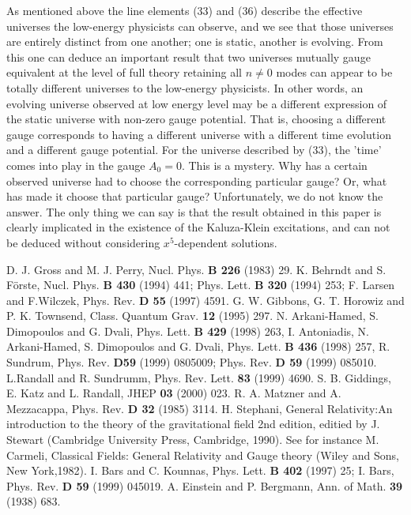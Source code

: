 \documentclass[a4paper,12pt]{article}
\begin{document}
 As mentioned above the line elements (33) and (36)
describe the effective universes the low-energy physicists can
observe, and we see that those universes are entirely distinct
from one another; one is static, another is evolving. From this
one can deduce an important result that two universes mutually
gauge equivalent at the level of full theory retaining all $n\neq
0$ modes can appear to be totally different universes to the
low-energy physicists. In other words, an evolving universe
observed at low energy level may be a different expression of the
static universe with non-zero gauge potential. That is, choosing a
different gauge corresponds to having a different universe with a
different time evolution and a different gauge potential. For the
universe described by (33), the 'time' comes into play in the
gauge $A_0=0$. This is a mystery. Why has a certain observed
universe had to choose the corresponding particular gauge? Or,
what has made it choose that particular gauge? Unfortunately, we
do not know the answer. The only thing we can say is that the
result obtained in this paper is clearly implicated in the
existence of the Kaluza-Klein excitations, and can not be deduced
without considering $x^5$-dependent solutions.
\begin{thebibliography}{123}
D. J. Gross and M. J. Perry, Nucl. Phys. {\bf B 226} 
(1983) 29.
K. Behrndt and S. F\"{o}rste, Nucl. Phys. {\bf B  430}
(1994) 441; Phys. Lett. {\bf B 320} (1994) 253; F. Larsen and
F.Wilczek, Phys. Rev. {\bf D 55} (1997) 4591.
G. W. Gibbons, G. T. Horowiz and P. K. Townsend, Class.
Quantum Grav. {\bf 12} (1995) 297.
N. Arkani-Hamed, S. Dimopoulos and G. Dvali, Phys.
Lett. {\bf B 429} (1998) 263, I. Antoniadis, N. Arkani-Hamed, S.
Dimopoulos and G. Dvali, Phys. Lett. {\bf B 436} (1998) 257, R.
Sundrum, Phys. Rev. {\bf D59} (1999) 0805009; Phys. Rev. {\bf D
59} (1999) 085010.
L.Randall and R. Sundrumm, Phys. Rev. Lett. {\bf 83}
(1999) 4690.
S. B. Giddings, E. Katz and L. Randall, JHEP {\bf 03}
(2000) 023.
R. A. Matzner and A. Mezzacappa, Phys. Rev. {\bf D 32}
(1985) 3114.
H. Stephani, General Relativity:An introduction to the
theory of the gravitational field 2nd edition, editied by J.
Stewart (Cambridge University Press, Cambridge, 1990).
See for instance M. Carmeli, Classical Fields: General
 Relativity and Gauge theory (Wiley and Sons, New York,1982).
I. Bars and C. Kounnas, Phys. Lett. {\bf B 402} (1997)
25; I. Bars, Phys. Rev. {\bf D 59} (1999) 045019.
A. Einstein and P. Bergmann, Ann. of Math. {\bf 39}
(1938) 683.
\end{thebibliography}
\end{document}
